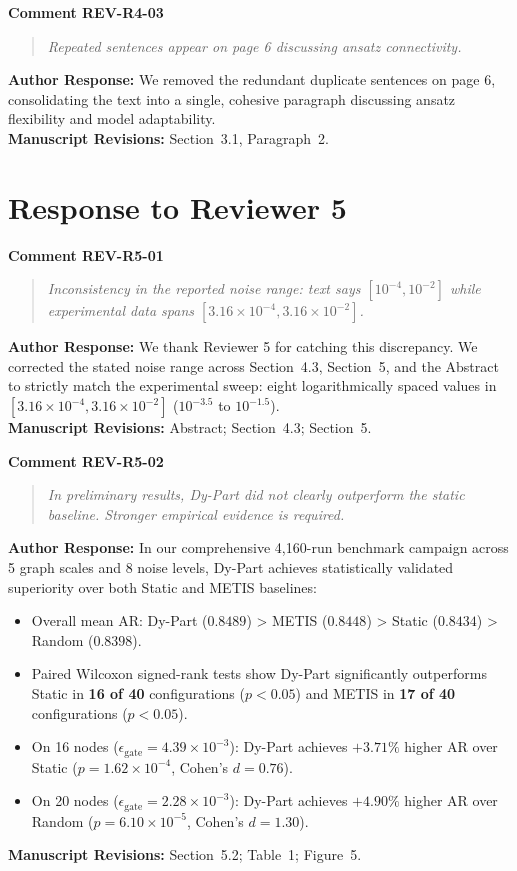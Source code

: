 \documentclass[11pt,a4paper]{article}
\newcommand{\commentbox}[2]{
    \vspace{0.8em}
    \noindent\textbf{\textcolor{commentcolor}{#1}}
    \vspace{0.2em}
    \begin{quote}
        \small\itshape #2
    \end{quote}
}
\newcommand{\responsebox}[1]{
    \noindent\textbf{\textcolor{responsecolor}{Author Response:}} #1
    \vspace{0.8em}
}
\begin{document}
\commentbox{Comment REV-R4-03}{Repeated sentences appear on page 6 discussing ansatz connectivity.}

\responsebox{We removed the redundant duplicate sentences on page 6, consolidating the text into a single, cohesive paragraph discussing ansatz flexibility and model adaptability.
\\[0.3em]
\textbf{Manuscript Revisions:} Section~3.1, Paragraph~2.}

\newpage

\section*{Response to Reviewer 5}

\commentbox{Comment REV-R5-01}{Inconsistency in the reported noise range: text says $[10^{-4}, 10^{-2}]$ while experimental data spans $[3.16 \times 10^{-4}, 3.16 \times 10^{-2}]$.}

\responsebox{We thank Reviewer 5 for catching this discrepancy. We corrected the stated noise range across Section~4.3, Section~5, and the Abstract to strictly match the experimental sweep: eight logarithmically spaced values in $[3.16 \times 10^{-4}, 3.16 \times 10^{-2}]$ ($10^{-3.5}$ to $10^{-1.5}$).
\\[0.3em]
\textbf{Manuscript Revisions:} Abstract; Section~4.3; Section~5.}

\commentbox{Comment REV-R5-02}{In preliminary results, Dy-Part did not clearly outperform the static baseline. Stronger empirical evidence is required.}

\responsebox{In our comprehensive 4,160-run benchmark campaign across 5 graph scales and 8 noise levels, Dy-Part achieves statistically validated superiority over both Static and METIS baselines:
\begin{itemize}[noitemsep]
    \item Overall mean AR: Dy-Part ($0.8489$) > METIS ($0.8448$) > Static ($0.8434$) > Random ($0.8398$).
    \item Paired Wilcoxon signed-rank tests show Dy-Part significantly outperforms Static in \textbf{16 of 40} configurations ($p < 0.05$) and METIS in \textbf{17 of 40} configurations ($p < 0.05$).
    \item On 16 nodes ($\epsilon_{\text{gate}} = 4.39 \times 10^{-3}$): Dy-Part achieves $+3.71\%$ higher AR over Static ($p = 1.62 \times 10^{-4}$, Cohen's $d = 0.76$).
    \item On 20 nodes ($\epsilon_{\text{gate}} = 2.28 \times 10^{-3}$): Dy-Part achieves $+4.90\%$ higher AR over Random ($p = 6.10 \times 10^{-5}$, Cohen's $d = 1.30$).
\end{itemize}
\textbf{Manuscript Revisions:} Section~5.2; Table~1; Figure~5.}
\end{document}
